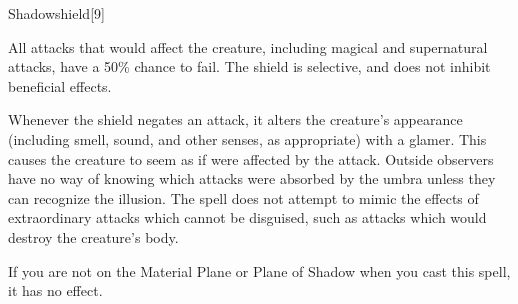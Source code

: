 \begin{spellsection}{Shadowshield}[9]
    \begin{spellheader}
    \end{spellheader}
    \begin{spellcontent}
        \begin{spelltargetinginfo}
        \end{spelltargetinginfo}
        \begin{spelleffects}
            \spelleffect All attacks that would affect the creature, including magical and supernatural attacks, have a 50\% chance to fail. The shield is selective, and does not inhibit beneficial effects.

            Whenever the shield negates an attack, it alters the creature's appearance (including smell, sound, and other senses, as appropriate) with a glamer. This causes the creature to seem as if were affected by the attack. Outside observers have no way of knowing which attacks were absorbed by the umbra unless they can recognize the illusion. The spell does not attempt to mimic the effects of extraordinary attacks which cannot be disguised, such as attacks which would destroy the creature's body.
            \spelldur \durshort
        \end{spelleffects}
    \end{spellcontent}
    \begin{spellfooter}
        \spellnotes If you are not on the Material Plane or Plane of Shadow when you cast this spell, it has no effect.
        \miscastrandom
    \end{spellfooter}
\end{spellsection}


